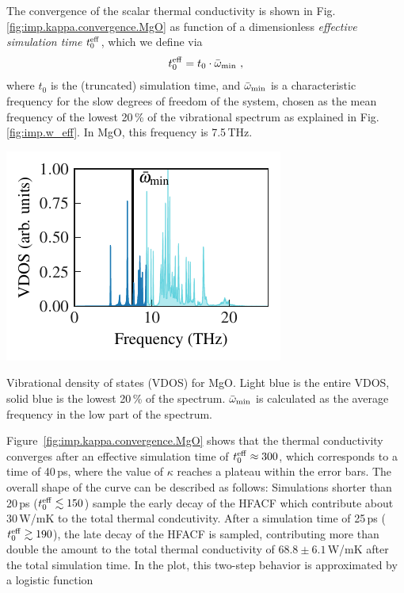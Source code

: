 The convergence of the scalar thermal conductivity is shown in Fig.\,\ref{fig:imp.kappa.convergence.MgO} as function of a dimensionless \emph{effective simulation time} $t_0^{\rm eff}$, which we define via
\begin{align}
	\teff = t_0 \cdot \bar{\omega}_{\rm min}~,
	\label{eq:imp.teff}
\end{align}
where $t_0$ is the (truncated) simulation time, and $\bar{\omega}_{\rm min}$ is a characteristic frequency for the slow degrees of freedom of the system, chosen as the mean frequency of the lowest 20\,\% of the vibrational spectrum as explained in Fig.\,\ref{fig:imp.w_eff}. In MgO, this frequency is 7.5\,THz.
\begin{marginfigure}
	\includegraphics[width=\textwidth]{./data/plots/kappa_convergence/t_eff/vdos.pdf}
	\caption{Vibrational density of states (VDOS) for MgO. Light blue is the entire VDOS, solid blue is the lowest 20\,\% of the spectrum. $\bar{\omega}_{\rm min}$ is calculated as the average frequency in the low part of the spectrum.}
	\label{fig:imp.w_eff}
\end{marginfigure}
Figure~\ref{fig:imp.kappa.convergence.MgO} shows that the thermal conductivity converges after an effective simulation time of $t^{\rm eff}_0 \approx 300$, which corresponds to a time of 40\,ps, where the value of $\kappa$ reaches a plateau within the error bars. The overall shape of the curve can be described as follows: Simulations shorter than 20\,ps ($t^{\rm eff}_0 \lesssim 150$) sample the early decay of the HFACF which contribute about 30\,W/mK to the total thermal condcutivity. After a simulation time of 25\,ps ($t^{\rm eff}_0 \gtrsim 190$), the late decay of the HFACF is sampled, contributing more than double the amount to the total thermal conductivity of $68.8 \pm 6.1$\,W/mK after the total simulation time. In the plot, this two-step behavior is approximated by a logistic function 
